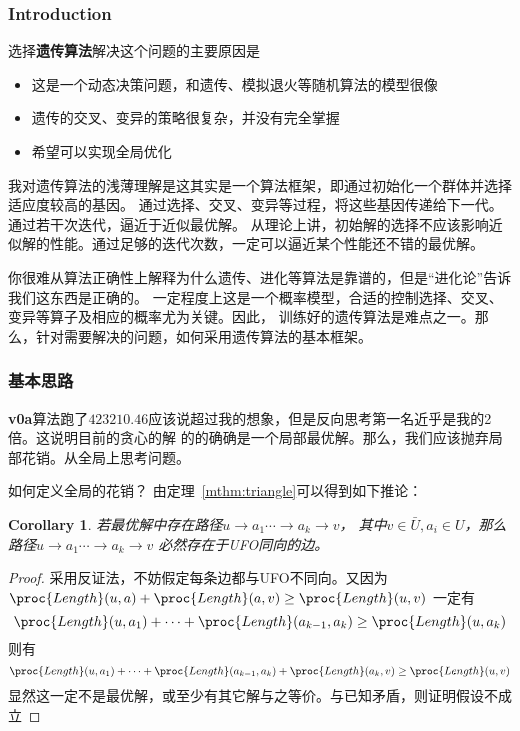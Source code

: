 \documentclass[hyperref,UTF8]{ctexart}
\newtheorem{cor}[thm]{Corollary}
\theoremstyle{definition}
\theoremstyle{remark}
\numberwithin{equation}{subsection}
\newcommand{\Emph}{\textbf}
\begin{document}
\subsubsection{Introduction}

	选择\Emph{遗传算法}解决这个问题的主要原因是
	\begin{itemize}
		
		\item 这是一个动态决策问题，和遗传、模拟退火等随机算法的模型很像
		
		\item 遗传的交叉、变异的策略很复杂，并没有完全掌握
		
		\item 希望可以实现全局优化
		
	\end{itemize}
	
	我对遗传算法的浅薄理解是这其实是一个算法框架，即通过初始化一个群体并选择适应度较高的基因。
	通过选择、交叉、变异等过程，将这些基因传递给下一代。通过若干次迭代，逼近于近似最优解。
	从理论上讲，初始解的选择不应该影响近似解的性能。通过足够的迭代次数，一定可以逼近某个性能还不错的最优解。
	
	你很难从算法正确性上解释为什么遗传、进化等算法是靠谱的，但是“进化论”告诉我们这东西是正确的。
	一定程度上这是一个概率模型，合适的控制选择、交叉、变异等算子及相应的概率尤为关键。因此，
	训练好的遗传算法是难点之一。那么，针对需要解决的问题，如何采用遗传算法的基本框架。
	
	
\subsubsection{基本思路}
	
	\Emph{v0a}算法跑了$423210.46$应该说超过我的想象，但是反向思考第一名近乎是我的2倍。这说明目前的贪心的解
	的的确确是一个局部最优解。那么，我们应该抛弃局部花销。从全局上思考问题。
	
	如何定义全局的花销？
	由定理~\ref{mthm:triangle}可以得到如下推论：
	\begin{cor}
		若最优解中存在路径$u \rightarrow a_1 \cdots \rightarrow a_k \rightarrow v$，
		其中$v \in \bar{U}, a_i \in U$，那么路径$u \rightarrow a_1 \cdots \rightarrow a_k \rightarrow v$
		必然存在于UFO同向的边。
	\end{cor}
	\begin{proof}
		采用反证法，不妨假定每条边都与UFO不同向。又因为$\proc{Length}(u, a) + \proc{Length}(a, v) \ge \proc{Length}(u, v)$
		一定有
		\[
			\proc{Length}(u, a_1) + \cdots + \proc{Length}(a_{k-1}, a_k) \ge \proc{Length}(u, a_k)
		\]
		则有
		\[
			\proc{Length}(u, a_1) + \cdots + \proc{Length}(a_{k-1}, a_k) + \proc{Length}(a_k, v) 
			\ge \proc{Length}(u, v)
		\]
		显然这一定不是最优解，或至少有其它解与之等价。与已知矛盾，则证明假设不成立
	\end{proof}
	
\end{document}
